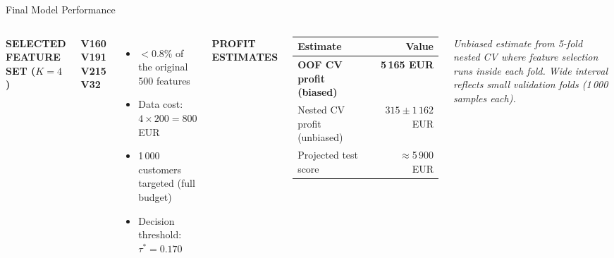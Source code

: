 \documentclass[aspectratio=169,10pt]{beamer}
\newcommand{\slabel}[1]{\textbf{\tiny\MakeUppercase{#1}}\\[0.25em]}
\begin{document}
\begin{frame}{Final Model Performance}
\begin{columns}[T]

\slabel{Selected feature set ($K=4$)}
\begin{center}
\textbf{V160 \; V191 \; V215 \; V32}
\end{center}
\begin{itemize}\itemsep2pt
  \item $<$0.8\% of the original 500 features
  \item Data cost: $4\times200 = 800$ EUR
  \item 1\,000 customers targeted (full budget)
  \item Decision threshold: $\tau^* = 0.170$
\end{itemize}


\slabel{Profit estimates}
\footnotesize
\begin{tabular}{@{}lr@{}}
\toprule
Estimate & Value \\
\midrule
\textbf{OOF CV profit (biased)} & \textbf{5\,165 EUR} \\
Nested CV profit (unbiased) & $315 \pm 1\,162$ EUR \\
\midrule
Projected test score & $\approx$5\,900 EUR \\
\bottomrule
\end{tabular}

\vspace{0.3em}
{\tiny\itshape Unbiased estimate from 5-fold nested CV where feature selection runs inside each fold. Wide interval reflects small validation folds (1\,000 samples each).}

\end{columns}
\end{frame}
\end{document}

